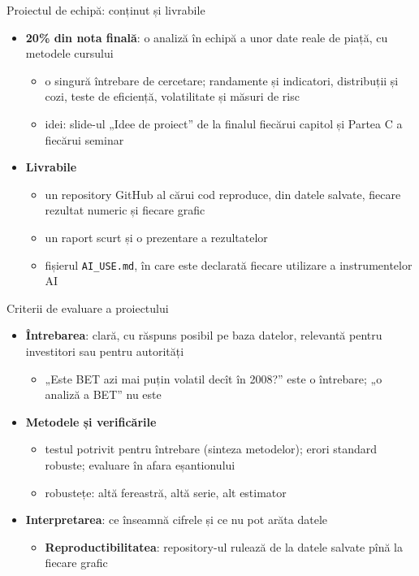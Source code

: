 \begin{frame}{Proiectul de echipă: conținut și livrabile}
\itemsize{\small}
\begin{itemize}
    \item \textbf{20\% din nota finală}: o analiză în echipă a unor date reale de piață, cu metodele cursului
    \begin{itemize}
        \item o singură întrebare de cercetare; randamente și indicatori, distribuții și cozi, teste de eficiență, volatilitate și măsuri de risc
        \item idei: slide-ul „Idee de proiect” de la finalul fiecărui capitol și Partea C a fiecărui seminar
    \end{itemize}
    \item \textbf{Livrabile}
    \begin{itemize}
        \item un repository GitHub al cărui cod reproduce, din datele salvate, fiecare rezultat numeric și fiecare grafic
        \item un raport scurt și o prezentare a rezultatelor
        \item fișierul \texttt{AI\_USE.md}, în care este declarată fiecare utilizare a instrumentelor AI
    \end{itemize}
\end{itemize}
\end{frame}

\begin{frame}{Criterii de evaluare a proiectului}
\itemsize{\small}
\begin{itemize}
    \item \textbf{Întrebarea}: clară, cu răspuns posibil pe baza datelor, relevantă pentru investitori sau pentru autorități
    \begin{itemize}
        \item „Este BET azi mai puțin volatil decît în 2008?” este o întrebare; „o analiză a BET” nu este
    \end{itemize}
    \item \textbf{Metodele și verificările}
    \begin{itemize}
        \item testul potrivit pentru întrebare (sinteza metodelor); erori standard robuste; evaluare în afara eșantionului
        \item robustețe: altă fereastră, altă serie, alt estimator
    \end{itemize}
    \item \textbf{Interpretarea}: ce înseamnă cifrele și ce nu pot arăta datele
    \begin{itemize}
        \item \textbf{Reproductibilitatea}: repository-ul rulează de la datele salvate pînă la fiecare grafic
    \end{itemize}
\end{itemize}
\end{frame}

